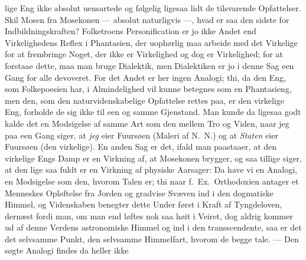 lige Eng ikke absolut uensartede og følgelig ligesaa lidt de
tilsvarende Opfattelser. Skil Mosen fra Mosekonen --- absolut naturligvis
---, hvad er saa den sidste for Indbildningskraften? Folketroens
Personification er jo ikke Andet end Virkelighedens Reflex i Phantasien, der
uophørlig maa arbeide med det Virkelige for at frembringe Noget, der ikke er
Virkelighed og dog er Virkelighed; for at forstaae dette, maa man bruge
Dialektik, men Dialektiken er jo i denne Sag een Gang for alle devoveret. For
det Andet er her ingen Analogi; thi, da den Eng, som Folkepoesien har, i
Almindelighed vil kunne betegnes som en Phantasieng, men den, som den
naturvidenskabelige Opfattelse rettes paa, er den virkelige Eng, forholde de
sig ikke til een og samme Gjenstand. Man kunde da ligesaa godt kalde det en
Modsigelse af samme Art som den mellem Tro og Viden, naar jeg paa een Gang
siger, at \emph{jeg} eier Fuursøen (Maleri af N.\ N.) og at \emph{Staten}
eier Fuursøen (den virkelige). En anden Sag er det, ifald man paastaaer, at
den virkelige Engs Damp er en Virkning af, at Mosekonen brygger, og saa
tillige siger, at den lige saa fuldt er en Virkning af physiske Aarsager: Da
have vi en Analogi, en Modsigelse som den, hvorom Talen er; thi naar f.\ Ex.\
Orthodoxien antager et Menneskes Opløftelse fra Jorden og gradvise Svæven ind
i den dogmatiske Himmel, og Videnskaben benegter dette Under først i Kraft af
Tyngdeloven, dernæst fordi man, om man end løftes nok saa høit i
Veiret, dog aldrig kommer ud af denne Verdens astronomiske Himmel
og ind i den transscendente, saa er det det selvsamme Punkt, den selvsamme
Himmelfart, hvorom de begge tale. --- Den søgte Analogi findes da heller ikke
